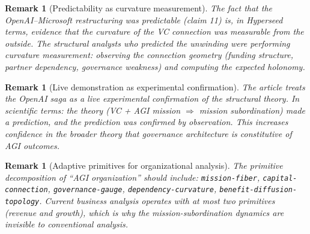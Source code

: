 \documentclass[11pt,a4paper]{article}
\newtheorem{remark}[definition]{Remark}
\begin{document}
\begin{remark}[Predictability as curvature measurement]
The fact that the OpenAI--Microsoft restructuring was predictable
(claim 11) is, in Hyperseed terms, evidence that the curvature of the
VC connection was measurable from the outside. The structural analysts
who predicted the unwinding were performing curvature measurement:
observing the connection geometry (funding structure, partner dependency,
governance weakness) and computing the expected holonomy.
\end{remark}

\begin{remark}[Live demonstration as experimental confirmation]
The article treats the OpenAI saga as a live experimental confirmation
of the structural theory. In scientific terms: the theory (VC + AGI
mission $\Rightarrow$ mission subordination) made a prediction, and
the prediction was confirmed by observation. This increases confidence
in the broader theory that governance architecture is constitutive
of AGI outcomes.
\end{remark}

\begin{remark}[Adaptive primitives for organizational analysis]
The primitive decomposition of ``AGI organization'' should include:
\texttt{mission-fiber}, \texttt{capital-connection}, \texttt{governance-gauge},
\texttt{dependency-curvature}, \texttt{benefit-diffusion-topology}.
Current business analysis operates with at most two primitives
(revenue and growth), which is why the mission-subordination dynamics
are invisible to conventional analysis.
\end{remark}
\end{document}
